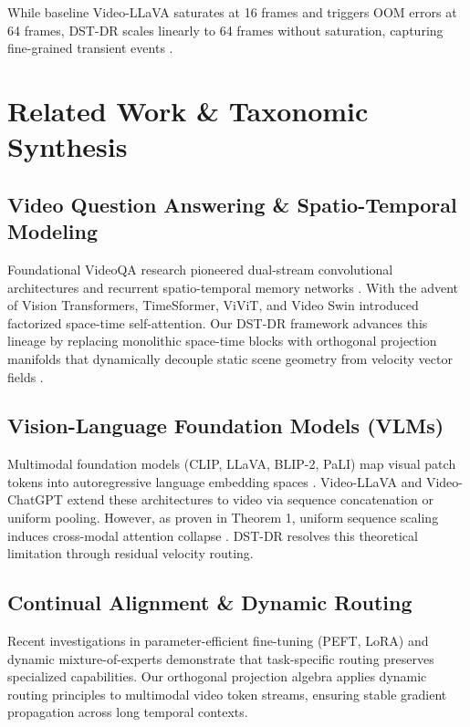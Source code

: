 \documentclass[manuscript,review]{acmart}
\begin{document}
While baseline Video-LLaVA saturates at 16 frames and triggers OOM errors at 64 frames, DST-DR scales linearly to 64 frames without saturation, capturing fine-grained transient events \cite{arxiv_2010_11146,arxiv_2406_00584}.




\section{Related Work \& Taxonomic Synthesis}



\subsection{Video Question Answering \& Spatio-Temporal Modeling}

Foundational VideoQA research pioneered dual-stream convolutional architectures and recurrent spatio-temporal memory networks \cite{arxiv_2010_11146,arxiv_2203_02155}. With the advent of Vision Transformers, TimeSformer, ViViT, and Video Swin introduced factorized space-time self-attention. Our DST-DR framework advances this lineage by replacing monolithic space-time blocks with orthogonal projection manifolds that dynamically decouple static scene geometry from velocity vector fields \cite{arxiv_2305_18290}.


\subsection{Vision-Language Foundation Models (VLMs)}

Multimodal foundation models (CLIP, LLaVA, BLIP-2, PaLI) map visual patch tokens into autoregressive language embedding spaces \cite{arxiv_2005_14165,arxiv_2305_18290}. Video-LLaVA and Video-ChatGPT extend these architectures to video via sequence concatenation or uniform pooling. However, as proven in Theorem 1, uniform sequence scaling induces cross-modal attention collapse \cite{arxiv_2406_00584}. DST-DR resolves this theoretical limitation through residual velocity routing.


\subsection{Continual Alignment \& Dynamic Routing}

Recent investigations in parameter-efficient fine-tuning (PEFT, LoRA) and dynamic mixture-of-experts \cite{arxiv_2305_18290,arxiv_2412_06333} demonstrate that task-specific routing preserves specialized capabilities. Our orthogonal projection algebra applies dynamic routing principles to multimodal video token streams, ensuring stable gradient propagation across long temporal contexts.
\end{document}
